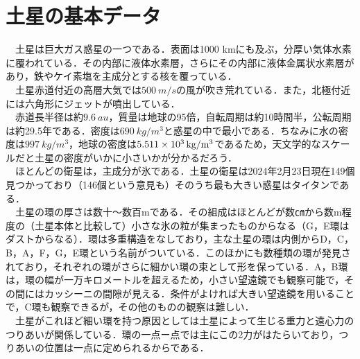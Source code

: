 \documentclass[../main]{subfiles}
\begin{document}
\section{土星の基本データ}
　土星は巨大ガス惑星の一つである．表面は1000 kmにも及ぶ，分厚い気体水素に覆われている．その内部に液体水素層，さらにその内部に液体金属状水素層があり，鉄やケイ素塩を主成分とする核を覆っている．\\
　土星赤道付近の高層大気では$\SI[mode=text]{500}{m/s}$の風が吹き荒れている．また，北極付近には六角形にジェットが噴出している．\\
　赤道長半径は約$\SI[mode=text]{9.6}{au}$，質量は地球の95倍，自転周期は約10時間半，公転周期は約29.5年である．密度は$\SI[mode=text]{690}{kg/m^3}$と惑星の中で最小である．ちなみに水の密度は$\SI[mode=text]{997}{kg/m^3}$，地球の密度は$\SI[mode=text]{5.511E3}{kg/m^3}$であるため，天文学的なスケールだと土星の密度がいかに小さいかが分かるだろう．\\
　ほとんどの衛星は，主成分が氷である．土星の衛星は2024年2月23日現在149個見つかっており（146個という意見も）そのうち最も大きい惑星はタイタンである．\\
　土星の環の厚さは数十〜数百mである．その組成はほとんどが数㎝から数m程度の（土星本体と比較して）小さな氷の粒が集まったものからなる（G，E環はダストからなる）．環は多重構造をなしており，主な土星の環は内側からD，C，B，A，F，G，E環という名前がついている．このほかにも数種類の環が発見されており，それぞれの環がさらに細かい環の束として形を保っている．A，B環は，環の幅が一万キロメートルを超えるため，小さい望遠鏡でも観察可能で，その間にはカッシーニの間隙が見える．条件がよければ大きい望遠鏡を用いることで，C環も観察できるが，その他のものの観察は難しい．\\
　土星がこれほど細い環を持つ原因としては土星によって生じる重力と遠心力のつりあいが関係している．環の一点ー点では主にこの2力がはたらいており，つりあいの位置は一点に定められるからである．
\end{document}
